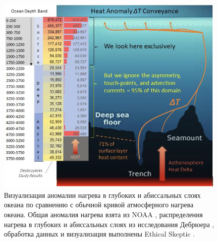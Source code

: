 \documentclass[10pt,twocolumn,letterpaper]{article}
\begin{document}
\begin{figure}[t]
\begin{center}
\includegraphics[width=1\textwidth]{deepsea.jpg}
\end{center}
   \caption{Визуализация аномалии нагрева в глубоких и абиссальных слоях океана по сравнению с обычной кривой атмосферного нагрева океана. Общая аномалия нагрева взята из NOAA \cite{147}, распределения нагрева в глубоких и абиссальных слоях из исследования Дебрюера \cite{132}, обработка данных и визуализация выполнены Ethical Skeptic \cite{129}.}
\label{fig:21}
\end{figure}
\end{document}
